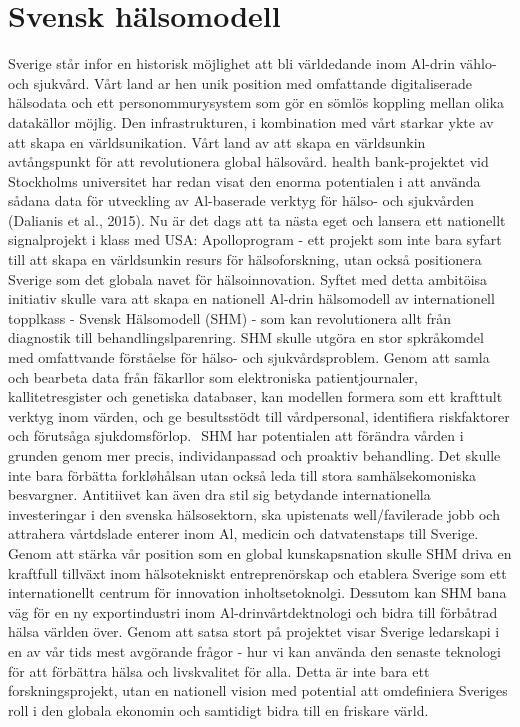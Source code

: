 {{{{{{{{{{{{{\section*{Svensk hälsomodell}
Sverige står infor en historisk möjlighet att bli världedande inom Al-drin vählo- och sjukvård. Vårt land ar hen unik position med omfattande digitaliserade hälsodata och ett personommurysystem som gör en sömlös koppling mellan olika datakällor möjlig. Den infrastrukturen, i kombination med vårt starkar ykte av att skapa en världsunikation. Vårt land av att skapa en världsunkin avtångspunkt för att revolutionera global hälsovård. health bank-projektet vid Stockholms universitet har redan visat den enorma potentialen i att använda sådana data för utveckling av Al-baserade verktyg för hälso- och sjukvården (Dalianis et al., 2015). Nu är det dags att ta nästa eget och lansera ett nationellt signalprojekt i klass med USA: Apolloprogram - ett projekt som inte bara syfart till att skapa en världsunkin resurs för hälsoforskning, utan också positionera Sverige som det globala navet för hälsoinnovation.
Syftet med detta ambitöisa initiativ skulle vara att skapa en nationell Al-drin hälsomodell av internationell topplkass - Svensk Hälsomodell
(SHM) - som kan revolutionera allt från diagnostik till behandlingslparenring.
SHM skulle utgöra en stor spkråkomdel med omfattvande förståelse för hälso- och sjukvårdsproblem. Genom att samla och bearbeta data från fäkarllor som elektroniska patientjournaler, kallitetresgister och genetiska databaser, kan modellen formera som ett krafttult verktyg inom värden, och ge besultsstödt till vårdpersonal, identifiera riskfaktorer och förutsåga sjukdomsförlop. \({ }^{}\)
SHM har potentialen att förändra vården i grunden genom mer precis, individanpassad och proaktiv behandling. Det skulle inte bara förbätta forkløhålsan utan också leda till stora samhälsekomoniska besvargner. Antitiivet kan även dra stil sig betydande internationella investeringar i den svenska hälsosektorn, ska upistenats well/favilerade jobb och attrahera vårtdslade enterer inom Al, medicin och datvatenstaps
till Sverige. Genom att stärka vår position som en global kunskapsnation skulle SHM driva en kraftfull tillväxt inom hälsotekniskt entreprenörskap och etablera Sverige som ett internationellt centrum för innovation inholtsetoknolgi. Dessutom kan SHM bana väg för en ny exportindustri inom Al-drinvårtdektnologi och bidra till förbåtrad hälsa världen över.
Genom att satsa stort på projektet visar Sverige ledarskapi i en av vår tids mest avgörande frågor - hur vi kan använda den senaste teknologi för att förbättra hälsa och livskvalitet för alla. Detta är inte bara ett forskningsprojekt, utan en nationell vision med potential att omdefiniera Sveriges roll i den globala ekonomin och samtidigt bidra till en friskare värld.
}}}}}}}}}}}}}
